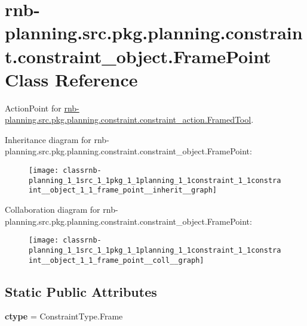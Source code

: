 \hypertarget{classrnb-planning_1_1src_1_1pkg_1_1planning_1_1constraint_1_1constraint__object_1_1_frame_point}{}\section{rnb-\/planning.src.\+pkg.\+planning.\+constraint.\+constraint\+\_\+object.\+Frame\+Point Class Reference}
\label{classrnb-planning_1_1src_1_1pkg_1_1planning_1_1constraint_1_1constraint__object_1_1_frame_point}


Action\+Point for \hyperlink{classrnb-planning_1_1src_1_1pkg_1_1planning_1_1constraint_1_1constraint__action_1_1_framed_tool}{rnb-\/planning.\+src.\+pkg.\+planning.\+constraint.\+constraint\+\_\+action.\+Framed\+Tool}.  




Inheritance diagram for rnb-\/planning.src.\+pkg.\+planning.\+constraint.\+constraint\+\_\+object.\+Frame\+Point\+:\nopagebreak
\begin{figure}[H]
\begin{center}
\leavevmode
\texttt{[image: classrnb-planning\_1\_1src\_1\_1pkg\_1\_1planning\_1\_1constraint\_1\_1constraint\_\_object\_1\_1\_frame\_point\_\_inherit\_\_graph]}
\end{center}
\end{figure}


Collaboration diagram for rnb-\/planning.src.\+pkg.\+planning.\+constraint.\+constraint\+\_\+object.\+Frame\+Point\+:\nopagebreak
\begin{figure}[H]
\begin{center}
\leavevmode
\texttt{[image: classrnb-planning\_1\_1src\_1\_1pkg\_1\_1planning\_1\_1constraint\_1\_1constraint\_\_object\_1\_1\_frame\_point\_\_coll\_\_graph]}
\end{center}
\end{figure}
\subsection*{Static Public Attributes}
\begin{DoxyCompactItemize}
\item 
\mbox{\label{classrnb-planning_1_1src_1_1pkg_1_1planning_1_1constraint_1_1constraint__object_1_1_frame_point_a948a12d39679aa708a6143b085bddbf0}} 
{\bfseries ctype} = Constraint\+Type.\+Frame
\end{DoxyCompactItemize}
